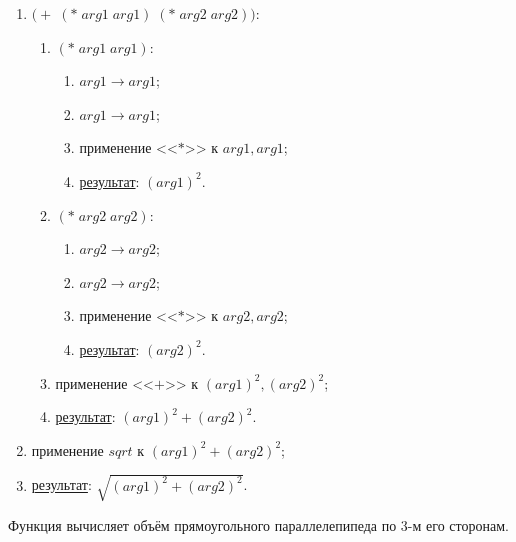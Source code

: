 \begin{enumerate}
	\item $\bigl(+\; (*\; arg1\; arg1)\; (*\; arg2\; arg2)\bigr)$:
	\begin{enumerate}
		\item $(*\; arg1\; arg1)$:
		\begin{enumerate}
			\item $arg1 \to arg1$;
			\item $arg1 \to arg1$;
			\item применение <<$*$>> к $arg1, arg1$;
			\item \underline{результат}: $(arg1)^2$.
		\end{enumerate}
		\item $(*\; arg2\; arg2)$:
		\begin{enumerate}
			\item $arg2 \to arg2$;
			\item $arg2 \to arg2$;
			\item применение <<$*$>> к $arg2, arg2$;
			\item \underline{результат}: $(arg2)^2$.
		\end{enumerate}
		\item применение <<$+$>> к $(arg1)^2, (arg2)^2$;
		\item \underline{результат}: $(arg1)^2 + (arg2)^2$.
	\end{enumerate}
	\item применение $sqrt$ к $(arg1)^2 + (arg2)^2$;
	\item \underline{результат}: $\sqrt{(arg1)^2 + (arg2)^2}$.
\end{enumerate}


\newpage
\problem Функция вычисляет объём прямоугольного параллелепипеда по 3-м его сторонам.


